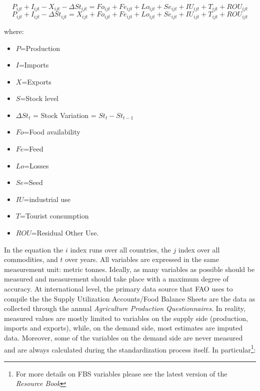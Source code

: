\documentclass[]{article}
\providecommand{\tightlist}{%
  \setlength{\itemsep}{0pt}\setlength{\parskip}{0pt}}
\let\rmarkdownfootnote\footnote%
\def\footnote{\protect\rmarkdownfootnote}
\begin{document}
\begin{equation}
\label{eq:balance1}
P_{ijt} + I_{ijt} - X_{ijt} - \Delta St_{ijt} = Fo_{ijt} + Fe_{ijt} + Lo_{ijt} + Se_{ijt} + IU_{ijt} + T_{ijt}  + ROU_{ijt}
\end{equation}\begin{equation}
\label{eq:balance2}
P_{ijt} + I_{ijt} - \Delta St_{ijt} = X_{ijt} + Fo_{ijt} + Fe_{ijt} + Lo_{ijt} + Se_{ijt} + IU_{ijt} + T_{ijt} + ROU_{ijt}
\end{equation}

where:

\begin{itemize}
\tightlist
\item
  \(P\)=Production
\item
  \(I\)=Imports
\item
  \(X\)=Exports
\item
  \(S\)=Stock level
\item
  \(\Delta St_{t}\) = Stock Variation = \(St_{t} - St_{t-1}\)
\item
  \(Fo\)=Food availability
\item
  \(Fe\)=Feed
\item
  \(Lo\)=Losses
\item
  \(Se\)=Seed
\item
  \(IU\)=industrial use
\item
  \(T\)=Tourist consumption
\item
  \(ROU\)=Residual Other Use.
\end{itemize}

In the equation the \(i\) index runs over all countries, the \(j\) index
over all commodities, and \(t\) over years. All variables are expressed
in the same measurement unit: metric tonnes. Ideally, as many variables
as possible should be measured and measurement should take place with a
maximum degree of accuracy. At international level, the primary data
source that FAO uses to compile the the Supply Utilization Accounts/Food
Balance Sheets are the data as collected through the annual
\emph{Agriculture Production Questionnaires}. In reality, measured
values are mostly limited to variables on the supply side (production,
imports and exports), while, on the demand side, most estimates are
imputed data. Moreover, some of the variables on the demand side are
never measured and are always calculated during the standardization
process itself. In particular\footnote{For more details on FBS variables
  please see the latest version of the \emph{Resource Book}}:
\end{document}
